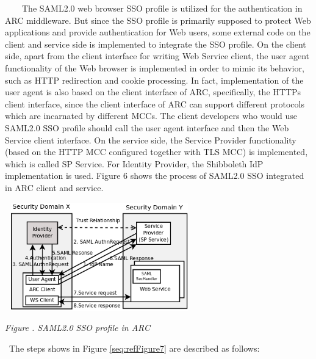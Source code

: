 \documentclass{article}
\newcounter{Figure}
\renewcommand\theFigure{\arabic{Figure}}
\begin{document}
{\upshape\color{black}
\ \ \ \ The SAML2.0 web browser SSO profile is utilized for the
authentication in ARC middleware. But since the SSO profile is
primarily supposed to protect Web applications and provide
authentication for Web users, some external code on the client and
service side is implemented to integrate the SSO profile. On the client
side, apart from the client interface for writing Web Service client,
the user agent functionality of the Web browser is implemented in order
to mimic its behavior, such as HTTP redirection and cookie processing.
In fact, implementation of the user agent is also based on the client
interface of ARC, specifically, the HTTPs client interface, since the
client interface of ARC can support different protocols which are
incarnated by different MCCs. The client developers who would use
SAML2.0 SSO profile should call the user agent interface and then the
Web Service client interface. On the service side, the Service Provider
functionality (based on the HTTP MCC configured together with TLS MCC)
is implemented, which is called SP Service. For Identity Provider, the
Shibboleth IdP implementation is used. Figure 6 shows the process of
SAML2.0 SSO integrated in ARC client and service.}


\bigskip

{\centering 
\includegraphics[width=3.2256in,height=1.8472in]{SecurityFrameworkofARC1-img7.png}
\par}

{\centering{}\itshape\color{black}
Figure
{\theFigure\label{seq:refFigure7}}.\textbf{
}SAML2.0 SSO profile in ARC
\par}

{\color{black}
\ The steps shows in Figure \ref{seq:refFigure7} are described as
follows:}
\end{document}
